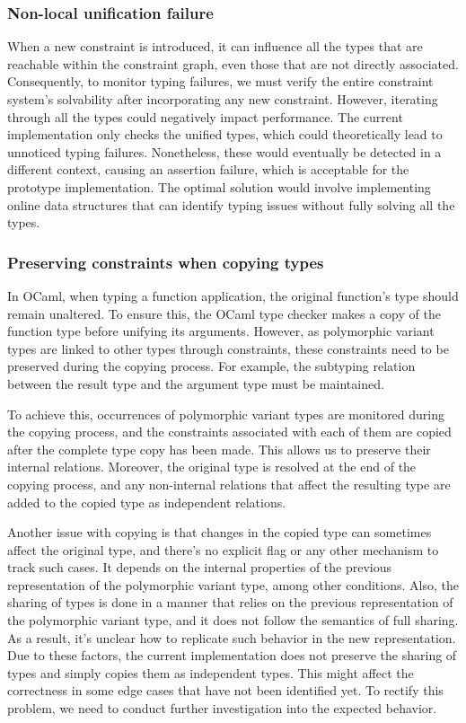 \documentclass[a4paper,11pt,oneside]{article}
\theoremstyle{definition}
\begin{document}
\subsubsection{Non-local unification failure}

When a new constraint is introduced, it can influence all the types that are reachable within the constraint graph, even those that are not directly associated. Consequently, to monitor typing failures, we must verify the entire constraint system's solvability after incorporating any new constraint. However, iterating through all the types could negatively impact performance. The current implementation only checks the unified types, which could theoretically lead to unnoticed typing failures. Nonetheless, these would eventually be detected in a different context, causing an assertion failure, which is acceptable for the prototype implementation. The optimal solution would involve implementing online data structures that can identify typing issues without fully solving all the types.

\subsubsection{Preserving constraints when copying types}

In OCaml, when typing a function application, the original function's type should remain unaltered. To ensure this, the OCaml type checker makes a copy of the function type before unifying its arguments. However, as polymorphic variant types are linked to other types through constraints, these constraints need to be preserved during the copying process. For example, the subtyping relation between the result type and the argument type must be maintained.

To achieve this, occurrences of polymorphic variant types are monitored during the copying process, and the constraints associated with each of them are copied after the complete type copy has been made. This allows us to preserve their internal relations. Moreover, the original type is resolved at the end of the copying process, and any non-internal relations that affect the resulting type are added to the copied type as independent relations.

Another issue with copying is that changes in the copied type can sometimes affect the original type, and there's no explicit flag or any other mechanism to track such cases. It depends on the internal properties of the previous representation of the polymorphic variant type, among other conditions. Also, the sharing of types is done in a manner that relies on the previous representation of the polymorphic variant type, and it does not follow the semantics of full sharing. As a result, it's unclear how to replicate such behavior in the new representation. Due to these factors, the current implementation does not preserve the sharing of types and simply copies them as independent types. This might affect the correctness in some edge cases that have not been identified yet. To rectify this problem, we need to conduct further investigation into the expected behavior.
\end{document}
